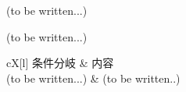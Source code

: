 

(to be written...)


\modHeadsection{\TBW}
(to be written...)

\begin{multicollongtblr}{\TBW}{cX[l]}
条件分岐 & 内容\\
(to be written...) & (to be written..)\\
\end{multicollongtblr}


\clearrightpage

